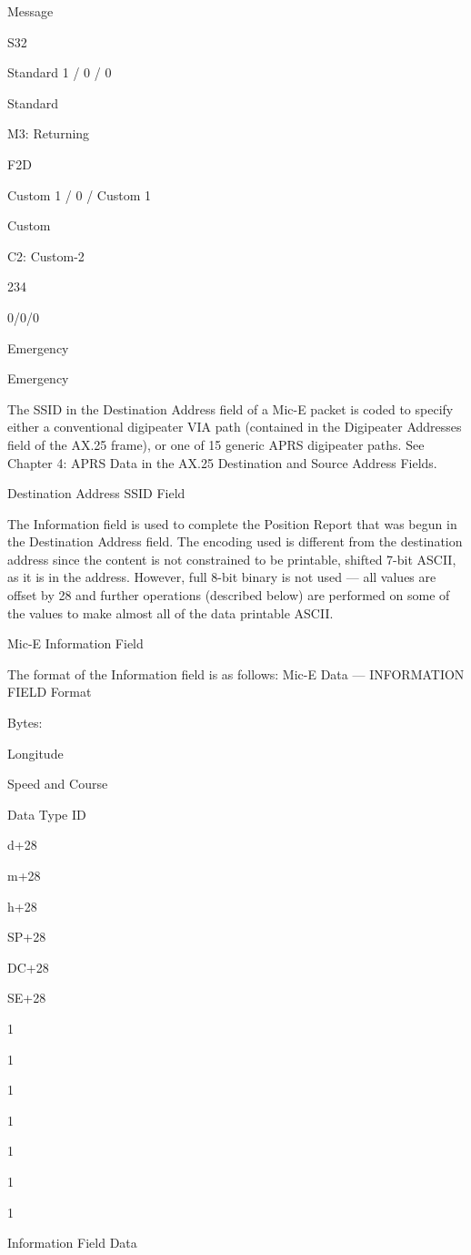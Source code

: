 {{{{{Message

S32

Standard 1 / 0 / 0

Standard

M3: Returning

F2D

Custom 1 / 0 / Custom 1

Custom

C2: Custom-2

234

0/0/0

Emergency

Emergency

The SSID in the Destination Address field of a Mic-E packet is coded to
specify either a conventional digipeater VIA path (contained in the
Digipeater Addresses field of the AX.25 frame), or one of 15 generic APRS
digipeater paths. See Chapter 4: APRS Data in the AX.25 Destination and
Source Address Fields.

Destination
Address
SSID Field

The Information field is used to complete the Position Report that was begun
in the Destination Address field. The encoding used is different from the
destination address since the content is not constrained to be printable,
shifted 7-bit ASCII, as it is in the address. However, full 8-bit binary is not
used — all values are offset by 28 and further operations (described below)
are performed on some of the values to make almost all of the data printable
ASCII.

Mic-E Information
Field

The format of the Information field is as follows:
Mic-E Data — INFORMATION FIELD Format

Bytes:

Longitude

Speed and Course

Data
Type
ID

d+28

m+28

h+28

SP+28

DC+28

SE+28

1

1

1

1

1

1

1

Information Field
Data

}}}}}

